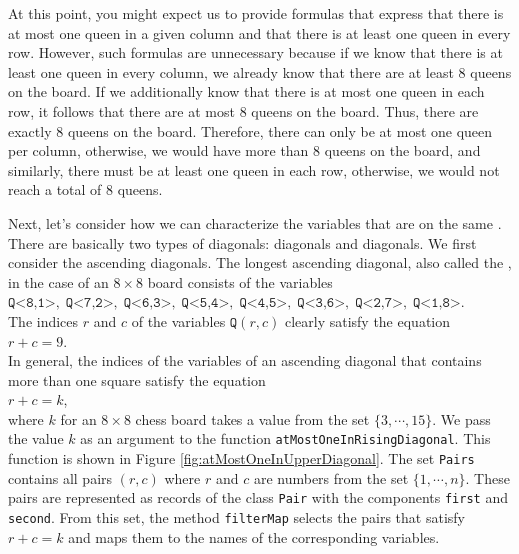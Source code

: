 At this point, you might expect us to provide formulas that express that there is at most one queen in a given column and that there is at least one queen in every row.
However, such formulas are unnecessary because if we know that there is at least one queen in every column, we already know that there are at least 8 queens on the board.
If we additionally know that there is at most one queen in each row, it follows that there are at most 8 queens on the board. Thus, there are exactly
8 queens on the board. Therefore, there can only be at most one queen per column, otherwise, we would have more than 8 queens on the board, and similarly, there must be at least one queen in each row, otherwise, we would not reach a total of 8 queens.

Next, let's consider how we can characterize the variables that are on the same .
There are basically two types of diagonals:  diagonals and  diagonals. We first consider
the ascending diagonals. The longest ascending diagonal, also called the
, in the case of an $8 \times 8$ board consists of the
variables \\[0.2cm]
\hspace*{1.3cm} 
$\texttt{Q<8,1>},\; \texttt{Q<7,2>},\; \texttt{Q<6,3>},\; \texttt{Q<5,4>},\; \texttt{Q<4,5>},\; \texttt{Q<3,6>},\; 
 \texttt{Q<2,7>},\; \texttt{Q<1,8>}$.
\\[0.2cm]
The indices $r$ and $c$ of the variables $\texttt{Q}(r,c)$ clearly satisfy
the equation \\[0.2cm]
\hspace*{1.3cm} $r + c = 9$. \\[0.2cm]
In general, the indices of the variables of an ascending diagonal that contains more than one square satisfy the
equation \\[0.2cm] 
\hspace*{1.3cm} $r + c = k$, \\[0.2cm]
where $k$ for an $8 \times 8$ chess board takes a value from the set $\{3, \cdots, 15 \}$. We pass the value $k$ as an argument to the
function \texttt{atMostOneInRisingDiagonal}. This function is shown in Figure
\ref{fig:atMostOneInUpperDiagonal}.  The set \texttt{Pairs} contains all pairs $(r, c)$ where $r$ and $c$ are
numbers from the set $\{1, \cdots, n\}$.  These pairs are represented as records of the class \texttt{Pair}
with the components \texttt{first} and \texttt{second}.  From this set, the method \texttt{filterMap} selects the
pairs that satisfy $r + c = k$ and maps them to the names of the corresponding variables.


